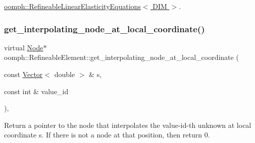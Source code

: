 \hyperlink{classoomph_1_1RefineableLinearElasticityEquations_ac048280ba30d323e92e42457f20163e4}{oomph\+::\+Refineable\+Linear\+Elasticity\+Equations$<$ D\+I\+M $>$}.

\mbox{\label{classoomph_1_1RefineableElement_ad920e66c00888c450f926f08c7793f78}} 
\subsubsection{\texorpdfstring{get\+\_\+interpolating\+\_\+node\+\_\+at\+\_\+local\+\_\+coordinate()}{get\_interpolating\_node\_at\_local\_coordinate()}}
{\footnotesize\ttfamily virtual \hyperlink{classoomph_1_1Node}{Node}$\ast$ oomph\+::\+Refineable\+Element\+::get\+\_\+interpolating\+\_\+node\+\_\+at\+\_\+local\+\_\+coordinate (\begin{DoxyParamCaption}\item[{const \hyperlink{classoomph_1_1Vector}{Vector}$<$ double $>$ \&}]{s,  }\item[{const int \&}]{value\+\_\+id }\end{DoxyParamCaption})\hspace{0.3cm}{\ttfamily [inline]}, {\ttfamily [virtual]}}



Return a pointer to the node that interpolates the value-\/id-\/th unknown at local coordinate s. If there is not a node at that position, then return 0. 




